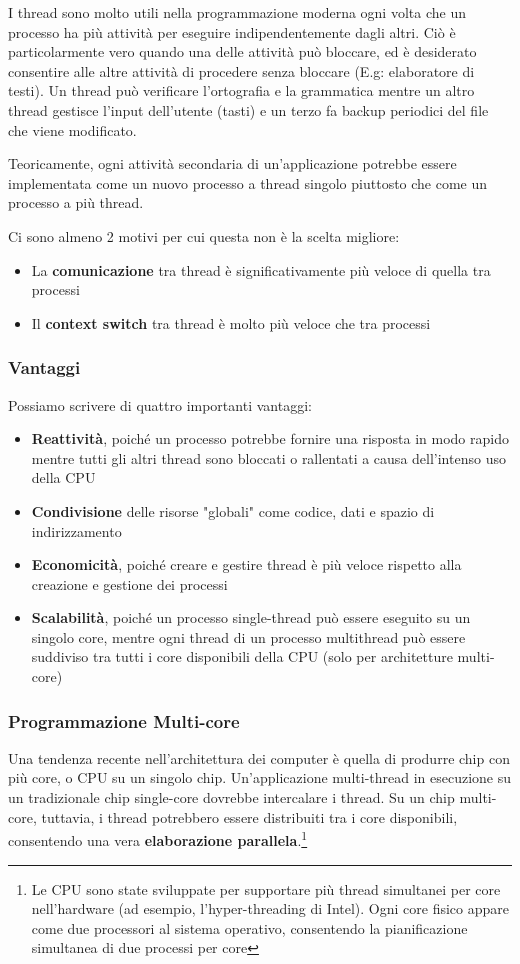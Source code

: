 \documentclass{article}
\begin{document}
I thread sono molto utili nella programmazione moderna ogni volta che un processo ha più attività per eseguire indipendentemente dagli altri. Ciò è particolarmente vero quando una delle attività può bloccare, ed è desiderato consentire alle altre attività di procedere senza bloccare (E.g: elaboratore di testi). Un thread può verificare l'ortografia e la grammatica mentre un altro thread gestisce l'input dell'utente (tasti) e un terzo fa backup periodici del file che viene modificato. \par
Teoricamente, ogni attività secondaria di un'applicazione potrebbe essere implementata come un nuovo processo a thread singolo piuttosto che come un processo a più thread.\par
Ci sono almeno 2 motivi per cui questa non è la scelta migliore:
\begin{itemize}
    \item La \textbf{comunicazione} tra thread è significativamente più veloce di quella tra processi 
    \item Il \textbf{context switch} tra thread è molto più veloce che tra processi
\end{itemize}


\subsubsection{Vantaggi}
Possiamo scrivere di quattro importanti vantaggi:
\begin{itemize}
    \item \textbf{Reattività}, poiché un processo potrebbe fornire una risposta in modo rapido mentre tutti gli altri thread sono bloccati o rallentati a causa dell'intenso uso della CPU
    \item \textbf{Condivisione} delle risorse "globali" come codice, dati e spazio di indirizzamento
    \item \textbf{Economicità}, poiché creare e gestire thread è più veloce rispetto alla creazione e gestione dei processi
    \item \textbf{Scalabilità}, poiché un processo single-thread può essere eseguito su un singolo core, mentre ogni thread di un processo multithread può essere suddiviso tra tutti i core disponibili della CPU (solo per architetture multi-core)
\end{itemize}

\subsubsection{Programmazione Multi-core}
Una tendenza recente nell'architettura dei computer è quella di produrre chip con più core, o CPU su un singolo chip. Un'applicazione multi-thread in esecuzione su un tradizionale chip single-core dovrebbe intercalare i thread. Su un chip multi-core, tuttavia, i thread potrebbero essere distribuiti tra i core disponibili, consentendo una vera \textbf{elaborazione parallela}.\footnote{Le CPU sono state sviluppate per supportare più thread simultanei per core nell'hardware (ad esempio, l'hyper-threading di Intel). Ogni core fisico appare come due processori al sistema operativo, consentendo la pianificazione simultanea di due processi per core}
\end{document}
